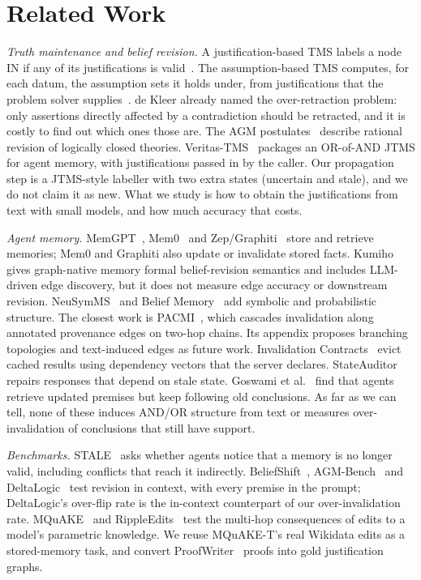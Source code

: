 \documentclass[conference]{IEEEtran}
\begin{document}
\section{Related Work}

\textit{Truth maintenance and belief revision.} A justification-based TMS labels a node IN if any of its justifications is valid~\cite{doyle1979}. The assumption-based TMS computes, for each datum, the assumption sets it holds under, from justifications that the problem solver supplies~\cite{dekleer1986}. de Kleer already named the over-retraction problem: only assertions directly affected by a contradiction should be retracted, and it is costly to find out which ones those are. The AGM postulates~\cite{agm1985} describe rational revision of logically closed theories. Veritas-TMS~\cite{veritas} packages an OR-of-AND JTMS for agent memory, with justifications passed in by the caller. Our propagation step is a JTMS-style labeller with two extra states (uncertain and stale), and we do not claim it as new. What we study is how to obtain the justifications from text with small models, and how much accuracy that costs.

\textit{Agent memory.} MemGPT~\cite{packer2023memgpt}, Mem0~\cite{chhikara2025mem0} and Zep/Graphiti~\cite{rasmussen2025zep} store and retrieve memories; Mem0 and Graphiti also update or invalidate stored facts. Kumiho~\cite{park2026kumiho} gives graph-native memory formal belief-revision semantics and includes LLM-driven edge discovery, but it does not measure edge accuracy or downstream revision. NeuSymMS~\cite{sultan2026neusymms} and Belief Memory~\cite{liao2026beliefmemory} add symbolic and probabilistic structure. The closest work is PACMI~\cite{wang2026pacmi}, which cascades invalidation along annotated provenance edges on two-hop chains. Its appendix proposes branching topologies and text-induced edges as future work. Invalidation Contracts~\cite{wu2026invalidation} evict cached results using dependency vectors that the server declares. StateAuditor~\cite{sun2026stateauditor} repairs responses that depend on stale state. Goswami et al.~\cite{goswami2026rederive} find that agents retrieve updated premises but keep following old conclusions. As far as we can tell, none of these induces AND/OR structure from text or measures over-invalidation of conclusions that still have support.

\textit{Benchmarks.} STALE~\cite{chao2026stale} asks whether agents notice that a memory is no longer valid, including conflicts that reach it indirectly. BeliefShift~\cite{myakala2026beliefshift}, AGM-Bench~\cite{jenkins2026agmbench} and DeltaLogic~\cite{dhanda2026deltalogic} test revision in context, with every premise in the prompt; DeltaLogic's over-flip rate is the in-context counterpart of our over-invalidation rate. MQuAKE~\cite{zhong2023mquake} and RippleEdits~\cite{cohen2024ripple} test the multi-hop consequences of edits to a model's parametric knowledge. We reuse MQuAKE-T's real Wikidata edits as a stored-memory task, and convert ProofWriter~\cite{tafjord2021proofwriter} proofs into gold justification graphs.
\end{document}

